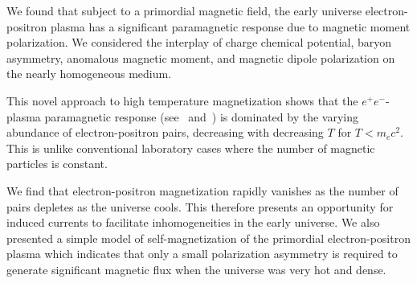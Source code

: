 We found that subject to a primordial magnetic field, the early universe electron-positron plasma has a significant paramagnetic response due to magnetic moment polarization. We considered the interplay of charge chemical potential, baryon asymmetry, anomalous magnetic moment, and magnetic dipole polarization on the nearly homogeneous medium.

This novel approach to high temperature magnetization shows that the $e^{+}e^{-}$-plasma paramagnetic response (see~ and~) is dominated by the varying abundance of electron-positron pairs, decreasing with decreasing $T$ for $T\!<\!m_{e}c^2$. This is unlike conventional laboratory cases where the number of magnetic particles is constant. 

We find that electron-positron magnetization rapidly vanishes as the number of pairs depletes as the universe cools. This therefore presents an opportunity for induced currents to facilitate inhomogeneities in the early universe. We also presented a simple model of self-magnetization of the primordial electron-positron plasma which indicates that only a small polarization asymmetry is required to generate significant magnetic flux when the universe was very hot and dense.